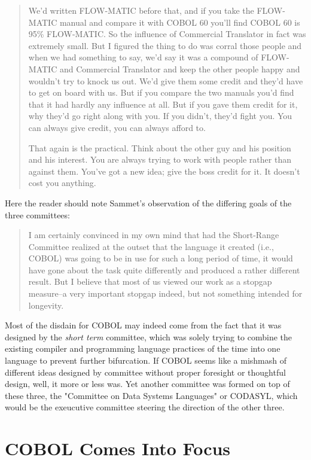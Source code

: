 \begin{quotation}
We'd written FLOW-MATIC before that, and if you take the FLOW-MATIC
manual and compare it with COBOL 60 you'll find COBOL 60 is 95\% FLOW-MATIC. So the
influence of Commercial Translator in fact was extremely small. But I figured the thing to do was
corral those people and when we had something to say, we'd say it was a compound of FLOW-MATIC
and Commercial Translator and keep the other people happy and wouldn't try to knock
us out. We'd give them some credit and they'd have to get on board with us. But if you compare
the two manuals you'd find that it had hardly any influence at all. But if you gave them credit for
it, why they'd go right along with you. If you didn't, they'd fight you. You can always give credit,
you can always afford to.

That again is the practical. Think about the other guy and his position and his interest. You are
always trying to work with people rather than against them. You've got a new idea; give the
boss credit for it. It doesn't cost you anything. 
\end{quotation}

Here the reader should note Sammet's observation of the differing goals of the three committees:

\begin{quotation}
I am certainly convinced in my own mind that had the Short-Range Committee 
realized at the outset that the language it created (i.e., COBOL) was going to 
be in use for such a long period of time, it would have gone about the task 
quite differently and produced a rather different result. But I believe that 
most of us viewed our work as a stopgap measure--a very important stopgap 
indeed, but not something intended for longevity.
\end{quotation}

Most of the disdain for COBOL may indeed come from the fact that it was designed by the \textit{short term}
committee, which was solely trying to combine the existing compiler and programming language practices
of the time into one language to prevent further bifurcation.
If COBOL seems like a mishmash of different ideas designed by committee without proper
foresight or thoughtful design, well, it more or less was.
Yet another committee was formed on top of these three, the "Committee on Data Systems Languages"
or CODASYL, which would be the exeucutive committee steering the direction of the other three.

\section{COBOL Comes Into Focus}

